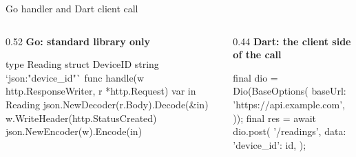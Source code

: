 \documentclass[10pt,aspectratio=169,t]{beamer}
\begin{document}
\begin{frame}[fragile,eyebrow=Go backends]{Go handler and Dart client call}
  \begin{columns}[T]
    \begin{column}{0.52\textwidth}
      {\bfseries Go: standard library only}\par
\begin{golang}
type Reading struct {
    DeviceID string `json:"device_id"`
}
func handle(w http.ResponseWriter,
    r *http.Request) {
    var in Reading
    json.NewDecoder(r.Body).Decode(&in)
    w.WriteHeader(http.StatusCreated)
    json.NewEncoder(w).Encode(in)
}
\end{golang}
    \end{column}
    \begin{column}{0.44\textwidth}
      {\bfseries Dart: the client side of the call}\par
\begin{dart}
final dio = Dio(BaseOptions(
  baseUrl:
      'https://api.example.com',
));
final res = await dio.post(
  '/readings',
  data: {'device_id': id},
);
\end{dart}
    \end{column}
  \end{columns}
\end{frame}
\end{document}
